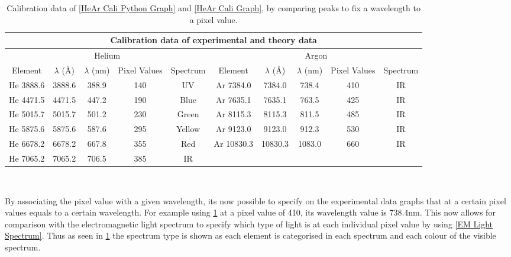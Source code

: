 \documentclass[12pt]{article}
\begin{document}
\begin{table}[H]
\begin{center}
 \footnotesize
 \begin{tabular}{|c|c|c|c|c||c|c|c|c|c|}
 \hline
 \multicolumn{10}{|c|}{Calibration data of experimental and theory data } \\
 \hline \hline
 \multicolumn{5}{|c||}{Helium} & \multicolumn{5}{c|}{Argon} \\
 \hline
 Element & $\lambda$ (\si{\angstrom}) & $\lambda$ (nm) & Pixel Values & Spectrum & Element & $\lambda$ (\si{\angstrom}) & $\lambda$ (nm) & Pixel Values & Spectrum \\
 \hline \hline
 He 3888.6 & 3888.6 & 388.9 & 140 & UV & Ar 7384.0 & 7384.0 & 738.4 & 410 & IR \\
 \hline
 He 4471.5 & 4471.5 & 447.2 & 190 & Blue & Ar 7635.1 & 7635.1 & 763.5 & 425 & IR\\
 \hline
 He 5015.7 & 5015.7 & 501.2 & 230 & Green & Ar 8115.3 & 8115.3 & 811.5 & 485 & IR \\
 \hline
 He 5875.6 & 5875.6 & 587.6 & 295 & Yellow & Ar 9123.0 & 9123.0 & 912.3 & 530 & IR \\
 \hline
 He 6678.2 & 6678.2 & 667.8 & 355 & Red & Ar 10830.3 & 10830.3 & 1083.0 & 660 & IR\\
 \hline
 He 7065.2 & 7065.2 & 706.5 & 385 & IR & & & & & \\
 \hline
 \end{tabular} \\ 
 \caption{Calibration data of \cref{HeAr Cali Python Graph} and \cref{HeAr Cali Graph}, by comparing peaks to fix a wavelength to a pixel value.}
 \label{Calibration Data}
\end{center}
\end{table} 
\vspace{-0.5cm}

\noindent By associating the pixel value with a given wavelength, its now possible to specify on the experimental data graphs that at a certain pixel values equals to a certain wavelength. For example using \cref{Calibration Data} at a pixel value of 410, its wavelength value is 738.4nm. This now allows for comparison with the electromagnetic light spectrum to specify which type of light is at each individual pixel value by using \cref{EM Light Spectrum}. Thus as seen in \cref{Calibration Data} the spectrum type is shown as each element is categorised in each spectrum and each colour of the visible spectrum. \\ [-1.0cm]
\end{document}
